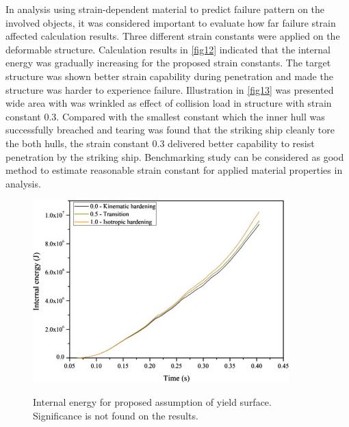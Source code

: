 \documentclass[../Final.tex]{subfiles}
\begin{document}
In analysis using strain-dependent material to predict failure pattern on the involved objects, it was considered important to evaluate how far failure strain affected calculation results. 
Three different strain constants were applied on the deformable structure. 
Calculation results in \ref{fig12} indicated that the internal energy was gradually increasing for the proposed strain constants. 
The target structure was shown better strain capability during penetration and made the structure was harder to experience failure. Illustration in \ref{fig13} was presented wide area with was wrinkled as effect 
of collision load in structure with strain constant 0.3. Compared with the smallest constant which the inner hull was successfully breached and tearing was found that the striking ship cleanly tore the both hulls, 
the strain constant 0.3 delivered better capability to resist penetration by the striking ship. 
Benchmarking study can be considered as good method to estimate reasonable strain constant for applied material properties in analysis. 

\begin{figure}[ht]
    \centering
    \includegraphics[width=\columnwidth]{fig14.jpg}
    \label{fig14}
    \caption{Internal energy for proposed assumption of yield surface. Significance is not found on the results.}
\end{figure}
\end{document}

